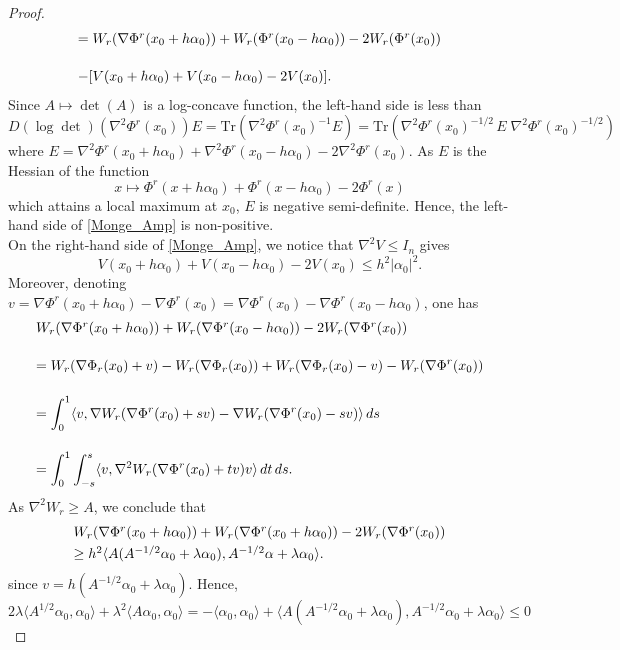 \documentclass[11pt,a4paper,reqno]{amsart}
\numberwithin{equation}{section}
\theoremstyle{definition}
\newcommand{\nm}{\noalign{\smallskip}}
\newcommand{\ds}{\displaystyle}
\newcommand{\<}{\ensuremath \leq}
\renewcommand{\>}{\ensuremath \geq}
\begin{document}
\begin{proof}
\begin{equation}
\begin{array}{lll}
    = W_r(\nabla \Phi^r(x_0+h\alpha_0))+W_r(\Phi^r(x_0-h\alpha_0))-2W_r(\Phi^r(x_0)) \\ \\
    \nm 
     -[V(x_0+h\alpha_0)+V(x_0-h\alpha_0)-2V(x_0)].
    \end{array}\end{equation} Since $A \mapsto \det(A)$ is a log-concave function, the left-hand side is less than $$D(\log \det)(\nabla^2 \Phi^r(x_0))E=\mathrm{Tr}(\nabla^2 \Phi^r(x_0)^{-1}E)=\mathrm{Tr}(\nabla^2 \Phi^r(x_0)^{-1/2} \, E \; \nabla^2 \Phi^r(x_0)^{-1/2})$$ where $E=\nabla^2 \Phi^r(x_0+h\alpha_0)+\nabla^2 \Phi^r(x_0-h\alpha_0)-2\nabla^2 \Phi^r(x_0).$ As $E$ is the Hessian of the function $$x \mapsto \Phi^r(x+h\alpha_0)+\Phi^r(x-h\alpha_0)-2\Phi^r(x)$$ which attains a local maximum at $x_0$, $E$ is negative semi-definite. Hence, the left-hand side of \cref{Monge_Amp} is non-positive. \\ On the right-hand side of \cref{Monge_Amp}, we notice that $\nabla^2 V \leq I_n$ gives $$V(x_0+h\alpha_0)+V(x_0-h\alpha_0)-2V(x_0) \leq h^2|\alpha_0|^2.$$ Moreover, denoting $v=\nabla \Phi^r(x_0+h\alpha_0)-\nabla \Phi^r(x_0)=\nabla \Phi^r(x_0)-\nabla \Phi^r(x_0-h\alpha_0)$, one has $$ \begin{array}{lll} W_r(\nabla \Phi^r(x_0+h\alpha_0))+W_r(\nabla \Phi^r(x_0-h\alpha_0))-2W_r(\nabla \Phi^r(x_0)) \\ \\
    \nm 
    = \ds W_r(\nabla \Phi_r(x_0)+v)-W_r(\nabla \Phi_r(x_0))+W_r(\nabla \Phi_r(x_0)-v)-W_r(\nabla \Phi^r(x_0)) \\ \\
    \nm 
    =\ds \int_0^1 \langle v, \nabla W_r(\nabla \Phi^r(x_0)+sv)-\nabla W_r(\nabla \Phi^r(x_0)-sv)\rangle \, ds \\ \\
    \nm 
    = \ds \int_0^1 \int_{-s}^s \langle v, \nabla^2 W_r(\nabla \Phi^r(x_0)+tv)v\rangle \, dt \, ds.
    \end{array}$$ 
 As $\nabla^2 W_r \geq A$, we conclude that
    $$\begin{array}{lll}W_r(\nabla \Phi^r(x_0+h\alpha_0))+W_r(\nabla \Phi^r(x_0+h\alpha_0))-2W_r(\nabla \Phi^r(x_0)) \\
    \nm 
    \geq h^2 \langle A(A^{-1/2}\alpha_0+\lambda \alpha_0),A^{-1/2}\alpha+\lambda \alpha_0\rangle.
    \end{array}$$ since $v=h(A^{-1/2}\alpha_0+\lambda \alpha_0).$ Hence, $$2\lambda \langle A^{1/2}\alpha_0,\alpha_0\rangle+\lambda^2 \langle A\alpha_0,\alpha_0\rangle=-\langle \alpha_0,\alpha_0\rangle+\langle A(A^{-1/2}\alpha_0+\lambda \alpha_0),A^{-1/2}\alpha_0+\lambda \alpha_0\rangle \leq 0$$

\end{proof}
\end{document}
